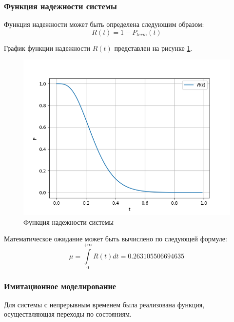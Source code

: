 \subsubsection{Функция надежности системы}

Функция надежности может быть определена следующим образом:
$$R(t)= 1 - P_{term}(t)$$

График функции надежности $R(t)$ представлен на рисунке \ref{R_t}.
\begin{figure}[H]
\centerline{\includegraphics[scale = .8]{Images/R_t.png}}
\caption{Функция надежности системы}
\label{R_t}
\end{figure}
Математическое ожидание может быть вычислено по следующей формуле:
$$\mu = \int\limits_0^{+\infty}R(t)dt = 0.263105506694635$$

\subsubsection{Имитационное моделирование}

Для системы с непрерывным временем была реализована функция, осуществляющая переходы по состояниям.

